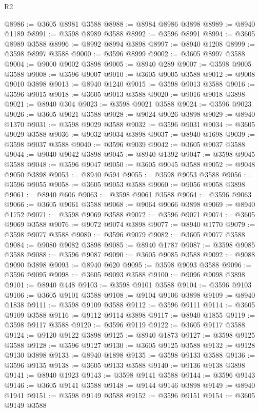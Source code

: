 \begin{lexlean}{R2}
\begin{coremodule}
@8986 := @3605 @8981 @3588
@8988 := @8984 @8986 @3898
@8989 := @8940 @1189
@8991 := @3598 @8989 @3588
@8992 := @3596 @8991
@8994 := @3605 @8989 @3588
@8996 := @8992 @8994 @3898
@8997 := @8940 @1208
@8999 := @3598 @8997 @3588
@9000 := @3596 @8999
@9002 := @3605 @8997 @3588
@9004 := @9000 @9002 @3898
@9005 := @8940 @289
@9007 := @3598 @9005 @3588
@9008 := @3596 @9007
@9010 := @3605 @9005 @3588
@9012 := @9008 @9010 @3898
@9013 := @8940 @1240
@9015 := @3598 @9013 @3588
@9016 := @3596 @9015
@9018 := @3605 @9013 @3588
@9020 := @9016 @9018 @3898
@9021 := @8940 @304
@9023 := @3598 @9021 @3588
@9024 := @3596 @9023
@9026 := @3605 @9021 @3588
@9028 := @9024 @9026 @3898
@9029 := @8940 @1370
@9031 := @3598 @9029 @3588
@9032 := @3596 @9031
@9034 := @3605 @9029 @3588
@9036 := @9032 @9034 @3898
@9037 := @8940 @1698
@9039 := @3598 @9037 @3588
@9040 := @3596 @9039
@9042 := @3605 @9037 @3588
@9044 := @9040 @9042 @3898
@9045 := @8940 @1392
@9047 := @3598 @9045 @3588
@9048 := @3596 @9047
@9050 := @3605 @9045 @3588
@9052 := @9048 @9050 @3898
@9053 := @8940 @594
@9055 := @3598 @9053 @3588
@9056 := @3596 @9055
@9058 := @3605 @9053 @3588
@9060 := @9056 @9058 @3898
@9061 := @8940 @606
@9063 := @3598 @9061 @3588
@9064 := @3596 @9063
@9066 := @3605 @9061 @3588
@9068 := @9064 @9066 @3898
@9069 := @8940 @1752
@9071 := @3598 @9069 @3588
@9072 := @3596 @9071
@9074 := @3605 @9069 @3588
@9076 := @9072 @9074 @3898
@9077 := @8940 @1770
@9079 := @3598 @9077 @3588
@9080 := @3596 @9079
@9082 := @3605 @9077 @3588
@9084 := @9080 @9082 @3898
@9085 := @8940 @1787
@9087 := @3598 @9085 @3588
@9088 := @3596 @9087
@9090 := @3605 @9085 @3588
@9092 := @9088 @9090 @3898
@9093 := @8940 @620
@9095 := @3598 @9093 @3588
@9096 := @3596 @9095
@9098 := @3605 @9093 @3588
@9100 := @9096 @9098 @3898
@9101 := @8940 @448
@9103 := @3598 @9101 @3588
@9104 := @3596 @9103
@9106 := @3605 @9101 @3588
@9108 := @9104 @9106 @3898
@9109 := @8940 @1838
@9111 := @3598 @9109 @3588
@9112 := @3596 @9111
@9114 := @3605 @9109 @3588
@9116 := @9112 @9114 @3898
@9117 := @8940 @1855
@9119 := @3598 @9117 @3588
@9120 := @3596 @9119
@9122 := @3605 @9117 @3588
@9124 := @9120 @9122 @3898
@9125 := @8940 @1873
@9127 := @3598 @9125 @3588
@9128 := @3596 @9127
@9130 := @3605 @9125 @3588
@9132 := @9128 @9130 @3898
@9133 := @8940 @1898
@9135 := @3598 @9133 @3588
@9136 := @3596 @9135
@9138 := @3605 @9133 @3588
@9140 := @9136 @9138 @3898
@9141 := @8940 @1923
@9143 := @3598 @9141 @3588
@9144 := @3596 @9143
@9146 := @3605 @9141 @3588
@9148 := @9144 @9146 @3898
@9149 := @8940 @1941
@9151 := @3598 @9149 @3588
@9152 := @3596 @9151
@9154 := @3605 @9149 @3588

\end{coremodule}
\end{lexlean}

